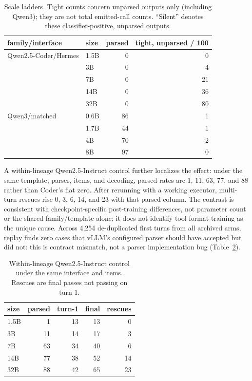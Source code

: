 \begin{table}[H]
\caption{Scale ladders. Tight counts concern unparsed outputs only (including Qwen3); they are not total emitted-call counts. ``Silent'' denotes these classifier-positive, unparsed outputs.}
\label{tab:ladders}
\label{tab:scale}
\centering
\small
\begin{tabular}{llrr}
\toprule
family/interface & size & parsed & tight, unparsed / 100 \\
\midrule
Qwen2.5-Coder/Hermes & 1.5B & 0 & 0 \\
 & 3B & 0 & 4 \\
 & 7B & 0 & 21 \\
 & 14B & 0 & 36 \\
 & 32B & 0 & 80 \\
\midrule
Qwen3/matched & 0.6B & 86 & 1 \\
 & 1.7B & 44 & 1 \\
 & 4B & 70 & 2 \\
 & 8B & 97 & 0 \\
\bottomrule
\end{tabular}
\end{table}

A within-lineage Qwen2.5-Instruct control further localizes the effect: under the same template,
parser, items, and decoding, parsed rates are 1, 11, 63, 77, and 88 rather than Coder's flat zero.
After rerunning with a working executor, multi-turn rescues rise 0, 3, 6, 14, and 23 with that
parsed column. The contrast is consistent with checkpoint-specific post-training differences,
not parameter count or the shared family/template alone; it does not identify tool-format training
as the unique cause. Across 4,254 de-duplicated first turns from all archived arms, replay finds
zero cases that vLLM's configured parser should have accepted but did not: this is contract
mismatch, not a parser implementation bug (Table~\ref{tab:instruct_main}).

\begin{table}[H]
\caption{Within-lineage Qwen2.5-Instruct control under the same interface and items. Rescues are
final passes not passing on turn 1.}
\label{tab:instruct_main}
\centering
\small
\begin{tabular}{lrrrr}
\toprule
size & parsed & turn-1 & final & rescues \\
\midrule
1.5B & 1 & 13 & 13 & 0 \\
3B & 11 & 14 & 17 & 3 \\
7B & 63 & 34 & 40 & 6 \\
14B & 77 & 38 & 52 & 14 \\
32B & 88 & 42 & 65 & 23 \\
\bottomrule
\end{tabular}
\end{table}

